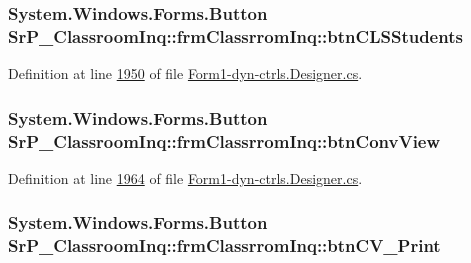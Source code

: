 \hypertarget{class_sr_p___classroom_inq_1_1frm_classrrom_inq_a0aed8d1ecf711f52b3a948fdeae6ac5b}{
\subsubsection[{btn\-C\-L\-S\-Students}]{\setlength{\rightskip}{0pt plus 5cm}\-System.\-Windows.\-Forms.\-Button {\bf \-Sr\-P\-\_\-\-Classroom\-Inq\-::frm\-Classrrom\-Inq\-::btn\-C\-L\-S\-Students}}}
\label{class_sr_p___classroom_inq_1_1frm_classrrom_inq_a0aed8d1ecf711f52b3a948fdeae6ac5b}


\-Definition at line \hyperlink{_form1-dyn-ctrls_8_designer_8cs_source_l01950}{1950} of file \hyperlink{_form1-dyn-ctrls_8_designer_8cs_source}{\-Form1-\/dyn-\/ctrls.\-Designer.\-cs}.

\hypertarget{class_sr_p___classroom_inq_1_1frm_classrrom_inq_ab75b7c14e1f4b71b6513122c99dbe532}{
\subsubsection[{btn\-Conv\-View}]{\setlength{\rightskip}{0pt plus 5cm}\-System.\-Windows.\-Forms.\-Button {\bf \-Sr\-P\-\_\-\-Classroom\-Inq\-::frm\-Classrrom\-Inq\-::btn\-Conv\-View}}}
\label{class_sr_p___classroom_inq_1_1frm_classrrom_inq_ab75b7c14e1f4b71b6513122c99dbe532}


\-Definition at line \hyperlink{_form1-dyn-ctrls_8_designer_8cs_source_l01964}{1964} of file \hyperlink{_form1-dyn-ctrls_8_designer_8cs_source}{\-Form1-\/dyn-\/ctrls.\-Designer.\-cs}.

\hypertarget{class_sr_p___classroom_inq_1_1frm_classrrom_inq_aa974c0ec46e2bca7bea74774e0f460d4}{
\subsubsection[{btn\-C\-V\-\_\-\-Print}]{\setlength{\rightskip}{0pt plus 5cm}\-System.\-Windows.\-Forms.\-Button {\bf \-Sr\-P\-\_\-\-Classroom\-Inq\-::frm\-Classrrom\-Inq\-::btn\-C\-V\-\_\-\-Print}}}
\label{class_sr_p___classroom_inq_1_1frm_classrrom_inq_aa974c0ec46e2bca7bea74774e0f460d4}


